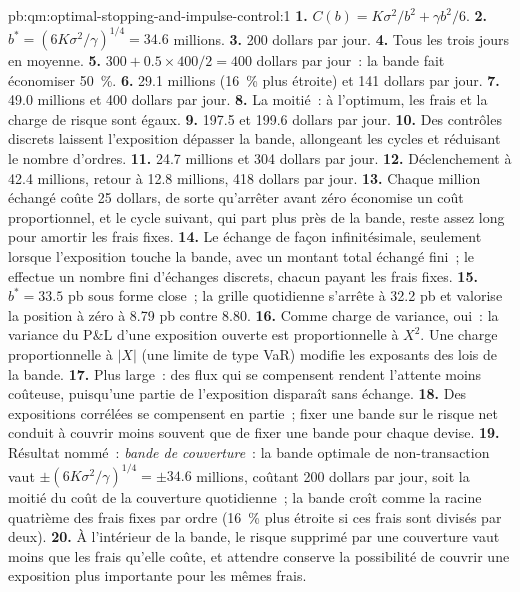 \begin{solution}{pb:qm:optimal-stopping-and-impulse-control:1}
\textbf{1.} $C(b) = K\sigma^2/b^2 + \gamma b^2/6$.
\textbf{2.} $b^* = (6K\sigma^2/\gamma)^{1/4} = 34.6$ millions.
\textbf{3.} 200 dollars par jour.
\textbf{4.} Tous les trois jours en moyenne.
\textbf{5.} $300 + 0.5 \times 400/2 = 400$ dollars par jour~: la bande fait économiser 50~\%.
\textbf{6.} 29.1 millions (16~\% plus étroite) et 141 dollars par jour.
\textbf{7.} 49.0 millions et 400 dollars par jour.
\textbf{8.} La moitié~: à l'optimum, les frais et la charge de risque sont égaux.
\textbf{9.} 197.5 et 199.6 dollars par jour.
\textbf{10.} Des contrôles discrets laissent l'exposition dépasser la bande, allongeant les cycles et réduisant le nombre d'ordres.
\textbf{11.} 24.7 millions et 304 dollars par jour.
\textbf{12.} Déclenchement à 42.4 millions, retour à 12.8 millions, 418 dollars par jour.
\textbf{13.} Chaque million échangé coûte 25 dollars, de sorte qu'arrêter avant zéro économise un coût proportionnel, et le cycle suivant, qui part
plus près de la bande, reste assez long pour amortir les frais fixes.
\textbf{14.} Le  échange de façon infinitésimale, seulement lorsque l'exposition touche la bande, avec un montant total échangé fini~; le 
effectue un nombre fini d'échanges discrets, chacun payant les frais fixes.
\textbf{15.} $b^* = 33.5$ pb sous forme close~; la grille quotidienne s'arrête à 32.2 pb et valorise la position à zéro à 8.79 pb contre 8.80.
\textbf{16.} Comme charge de variance, oui~: la variance du P\&L d'une exposition ouverte est proportionnelle à $X^2$. Une charge proportionnelle à $|X|$ (une
limite de type VaR) modifie les exposants des lois de la bande.
\textbf{17.} Plus large~: des flux qui se compensent rendent l'attente moins coûteuse, puisqu'une partie de l'exposition disparaît sans échange.
\textbf{18.} Des expositions corrélées se compensent en partie~; fixer une bande sur le risque net conduit à couvrir moins souvent que de fixer une bande pour chaque devise.
\textbf{19.} Résultat nommé~: \emph{bande de couverture}~: la bande optimale de non-transaction vaut $\pm(6K\sigma^2/\gamma)^{1/4} = \pm 34.6$ millions, coûtant 200 dollars par jour,
soit la moitié du coût de la couverture quotidienne~; la bande croît comme la racine quatrième des frais fixes par ordre (16~\% plus étroite si ces frais sont divisés par deux).
\textbf{20.} À l'intérieur de la bande, le risque supprimé par une couverture vaut moins que les frais qu'elle coûte, et attendre conserve la possibilité de couvrir une
exposition plus importante pour les mêmes frais.
\end{solution}

